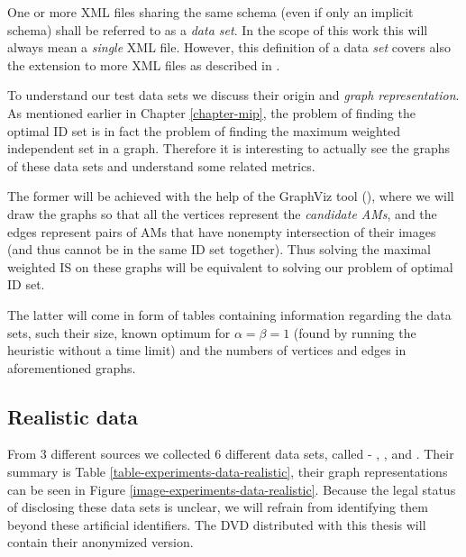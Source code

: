\begin{define}
	\label{define-data-set}
	One or more XML files sharing the same schema (even if only an implicit schema) shall be referred to as a \textit{data set}. In the scope of this work this will always mean a \textit{single} XML file. However, this definition of a data \textit{set} covers also the extension to more XML files as described in \cite{fidax}.
\end{define}

To understand our test data sets we discuss their origin and \textit{graph representation}. As mentioned earlier in Chapter \ref{chapter-mip}, the problem of finding the optimal ID set is in fact the problem of finding the maximum weighted independent set in a graph. Therefore it is interesting to actually see the graphs of these data sets and understand some related metrics.

The former will be achieved with the help of the GraphViz tool (\cite{graphviz}), where we will draw the graphs so that all the vertices represent the \textit{candidate AMs}, and the edges represent pairs of AMs that have nonempty intersection of their images (and thus cannot be in the same ID set together). Thus solving the maximal weighted IS on these graphs will be equivalent to solving our problem of optimal ID set.

The latter will come in form of tables containing information regarding the data sets, such their size, known optimum for $\alpha = \beta = 1$ (found by running the  heuristic without a time limit) and the numbers of vertices and edges in aforementioned graphs.

\subsection{Realistic data}
\label{section-realistic-data}

From 3 different sources we collected 6 different data sets, called  - , ,  and . Their summary is Table \ref{table-experiments-data-realistic}, their graph representations can be seen in Figure \ref{image-experiments-data-realistic}. Because the legal status of disclosing these data sets is unclear, we will refrain from identifying them beyond these artificial identifiers. The DVD distributed with this thesis will contain their anonymized version.

